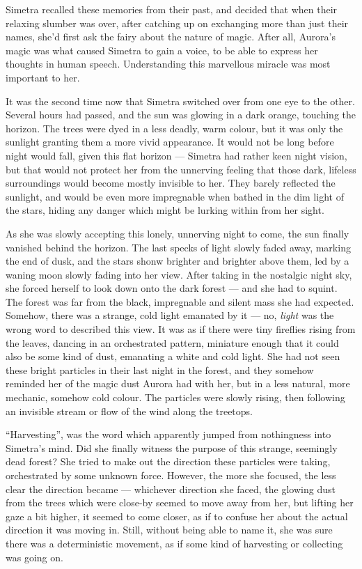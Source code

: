 Simetra recalled these memories from their past, and decided that when their relaxing slumber was over, after catching up on exchanging more than just their names, she'd first ask the fairy about the nature of magic. After all, Aurora's magic was what caused Simetra to gain a voice, to be able to express her thoughts in human speech. Understanding this marvellous miracle was most important to her.

It was the second time now that Simetra switched over from one eye to the other. Several hours had passed, and the sun was glowing in a dark orange, touching the horizon. The trees were dyed in a less deadly, warm colour, but it was only the sunlight granting them a more vivid appearance. It would not be long before night would fall, given this flat horizon --- Simetra had rather keen night vision, but that would not protect her from the unnerving feeling that those dark, lifeless surroundings would become mostly invisible to her. They barely reflected the sunlight, and would be even more impregnable when bathed in the dim light of the stars, hiding any danger which might be lurking within from her sight.

As she was slowly accepting this lonely, unnerving night to come, the sun finally vanished behind the horizon. The last specks of light slowly faded away, marking the end of dusk, and the stars shonw brighter and brighter above them, led by a waning moon slowly fading into her view. After taking in the nostalgic night sky, she forced herself to look down onto the dark forest --- and she had to squint. The forest was far from the black, impregnable and silent mass she had expected. Somehow, there was a strange, cold light emanated by it --- no, \emph{light} was the wrong word to described this view. It was as if there were tiny fireflies rising from the leaves, dancing in an orchestrated pattern, miniature enough that it could also be some kind of dust, emanating a white and cold light. She had not seen these bright particles in their last night in the forest, and they somehow reminded her of the magic dust Aurora had with her, but in a less natural, more mechanic, somehow cold colour. The particles were slowly rising, then following an invisible stream or flow of the wind along the treetops.

\enquote{Harvesting}, was the word which apparently jumped from nothingness into Simetra's mind. Did she finally witness the purpose of this strange, seemingly dead forest? She tried to make out the direction these particles were taking, orchestrated by some unknown force. However, the more she focused, the less clear the direction became --- whichever direction she faced, the glowing dust from the trees which were close-by seemed to move away from her, but lifting her gaze a bit higher, it seemed to come closer, as if to confuse her about the actual direction it was moving in. Still, without being able to name it, she was sure there was a deterministic movement, as if some kind of harvesting or collecting was going on.

